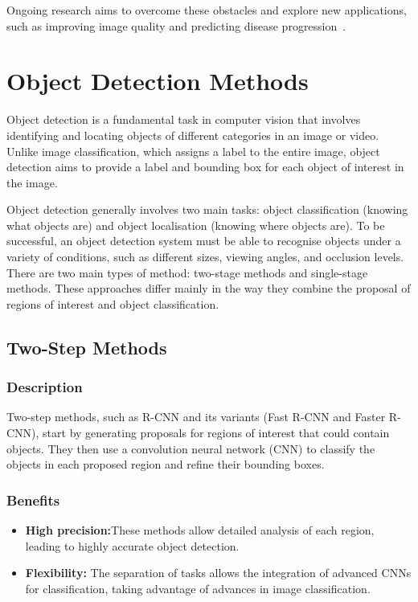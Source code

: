 \documentclass[12pt,oneside]{book} %
\begin{document}
Ongoing research aims to overcome these obstacles and explore new applications,
such as improving image quality and predicting disease
progression~\cite{Shen2017}.

\section{Object Detection Methods}

Object detection is a fundamental task in computer vision that involves
identifying and locating objects of different categories in an image or video.
Unlike image classification, which assigns a label to the entire image, object
detection aims to provide a label and bounding box for each object of interest
in the image.

Object detection generally involves two main tasks: object classification
(knowing what objects are) and object localisation (knowing where objects are).
To be successful, an object detection system must be able to recognise objects
under a variety of conditions, such as different sizes, viewing angles, and
occlusion levels. There are two main types of method: two-stage methods and
single-stage methods. These approaches differ mainly in the way they combine
the proposal of regions of interest and object classification.

\subsection{Two-Step Methods}

\subsubsection{Description}

Two-step methods, such as R-CNN and its variants (Fast R-CNN and Faster R-CNN),
start by generating proposals for regions of interest that could contain
objects. They then use a convolution neural network (CNN) to classify the
objects in each proposed region and refine their bounding boxes.

\subsubsection{Benefits}

\begin{itemize}
    \item \textbf{High precision:}These methods allow detailed analysis of each region, leading to highly accurate object detection.
    \item \textbf{Flexibility:} The separation of tasks allows the integration of advanced CNNs for classification, taking advantage of advances in image classification.
\end{itemize}
\end{document}
